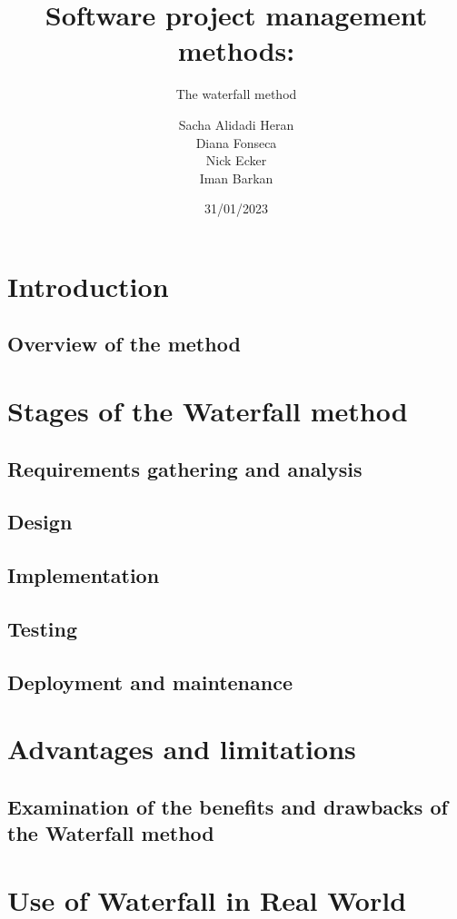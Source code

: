 \documentclass{beamer}
\title[Waterfall Method]{Software project management methods:}
\subtitle{The waterfall method}
\author[]{ Sacha Alidadi Heran \\ Diana Fonseca \\ Nick Ecker \\ Iman Barkan}
\institute[Projet, Master 1 CSMI]{}
\date{31/01/2023}
\begin{document}
\begin{frame}
\titlepage
\end{frame}


\section{Introduction}
\subsection{Overview of the method}




\section{Stages of the Waterfall method}
\subsection{Requirements gathering and analysis}
\subsection{Design}
\subsection{Implementation}
\subsection{Testing}
\subsection{Deployment and maintenance}







\section{Advantages and limitations}
\subsection{Examination of the benefits and drawbacks of the Waterfall method}



\section{Use of Waterfall in Real World}
\end{document}
